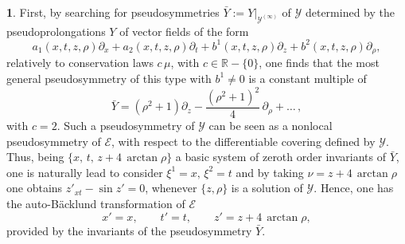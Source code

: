 \documentclass[12pt,english]{elsarticle}
\theoremstyle{plain}
\theoremstyle{plain}
\theoremstyle{remark}
\theoremstyle{plain}
\theoremstyle{definition}
\theoremstyle{definition}
\newtheorem{example}[thm]{\protect\examplename}
\providecommand{\examplename}{Example}
\begin{document}
\begin{example}
First, by searching for pseudosymmetries
$\bar{Y}:=\left .Y\right |_{\mathcal{Y}^{(\infty )}}$ of
$\mathcal{Y}$ determined by the pseudoprolongations $Y$ of vector fields
of the form
%
\begin{equation*}
a_{1}(x,t,z,\rho )\partial _{x}+a_{2}(x,t,z,\rho )\partial _{t}+b^{1}(x,t,z,
\rho )\partial _{z}+b^{2}(x,t,z,\rho )\partial _{\rho},
\end{equation*}
%
relatively to conservation laws $c\,\mu $, with
$c\in \mathbb{R}-\{0\}$, one finds that the most general pseudosymmetry
of this type with $b^{1}\neq 0$ is a constant multiple of
%
\begin{equation*}
\bar{Y}=\left (\rho ^{2}+1\right )\partial _{z}-\frac{\left(\rho ^{2}+1\right)^{2}}{4}
\,\partial _{\rho}+\ldots \,,
\end{equation*}
%
with $c=2$. Such a pseudosymmetry of $\mathcal{Y}$ can be seen as a nonlocal
pseudosymmetry of $\mathcal{E}$, with respect to the differentiable covering
defined by $\mathcal{Y}$. Thus, being
$\{x,\,t,\,z+4\,\arctan \rho \}$ a basic system of zeroth order invariants
of $\bar{Y}$, one is naturally lead to consider
$\xi ^{1}=x,\,\xi ^{2}=t$ and by taking $\nu =z+4\,\arctan \rho $ one obtains
$z'_{xt}-\sin z'=0$, whenever $\{z,\rho \}$ is a solution of
$\mathcal{Y}$. Hence, one has the auto-B\"{a}cklund transformation of
$\mathcal{E}$
%
\begin{equation*}
x'=x,\qquad t'=t,\qquad z'=z+4\,\arctan \rho ,
\end{equation*}
%
provided by the invariants of the pseudosymmetry $\bar{Y}$.
\end{example}
\end{document}
